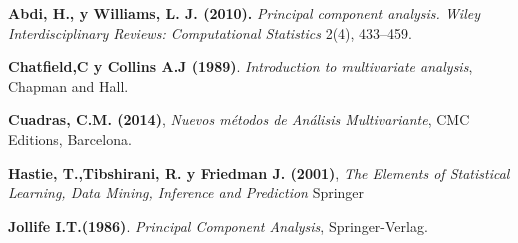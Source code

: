 
\begin{thebibliography}{99}
	

 \textbf{Abdi, H., y Williams, L. J. (2010).} \textit{Principal component analysis. Wiley Interdisciplinary Reviews: Computational Statistics}  2(4), 433–459. 

 \textbf{Chatfield,C y Collins A.J (1989)}. {\em Introduction to multivariate analysis}, Chapman and Hall.

 \textbf{Cuadras, C.M. (2014)}, \textit{Nuevos métodos de Análisis Multivariante}, CMC Editions, Barcelona. 

 \textbf{Hastie, T.,Tibshirani, R. y Friedman J. (2001)}, \textit{The Elements of Statistical Learning, Data Mining, Inference and Prediction} Springer 

 \textbf{Jollife I.T.(1986)}. {\em Principal Component Analysis}, Springer-Verlag.






          
        
\end{thebibliography}
 